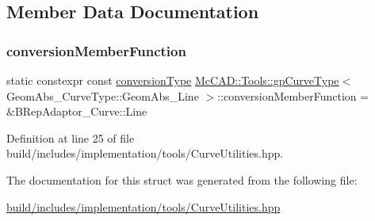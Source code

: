 \subsection{Member Data Documentation}
\mbox{\label{structMcCAD_1_1Tools_1_1gpCurveType_3_01GeomAbs__CurveType_1_1GeomAbs__Line_01_4_a596f8f61934665b19524601d4534c278}} 
\subsubsection{\texorpdfstring{conversion\+Member\+Function}{conversionMemberFunction}}
{\footnotesize\ttfamily static constexpr const \hyperlink{structMcCAD_1_1Tools_1_1gpCurveType_3_01GeomAbs__CurveType_1_1GeomAbs__Line_01_4_af5227152ea516936523a4a448a96723c}{conversion\+Type} \hyperlink{structMcCAD_1_1Tools_1_1gpCurveType}{Mc\+C\+A\+D\+::\+Tools\+::gp\+Curve\+Type}$<$ Geom\+Abs\+\_\+\+Curve\+Type\+::\+Geom\+Abs\+\_\+\+Line $>$\+::conversion\+Member\+Function = \&B\+Rep\+Adaptor\+\_\+\+Curve\+::\+Line\hspace{0.3cm}{\ttfamily [static]}}



Definition at line 25 of file build/includes/implementation/tools/\+Curve\+Utilities.\+hpp.



The documentation for this struct was generated from the following file\+:\begin{DoxyCompactItemize}
\item 
\hyperlink{build_2includes_2implementation_2tools_2CurveUtilities_8hpp}{build/includes/implementation/tools/\+Curve\+Utilities.\+hpp}\end{DoxyCompactItemize}
